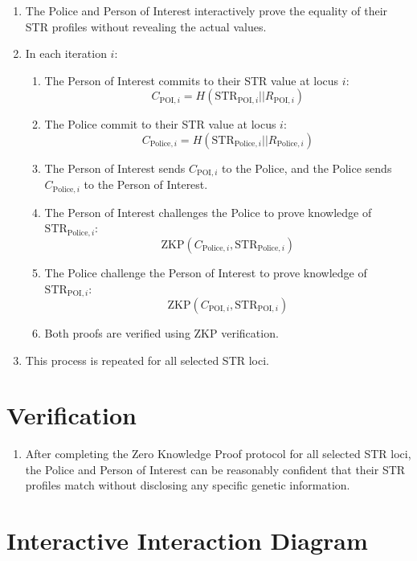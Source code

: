 \documentclass{article}
\begin{document}
\begin{enumerate}
    \item The Police and Person of Interest interactively prove the equality of their STR profiles without revealing the actual values.
    \item In each iteration $i$:
        \begin{enumerate}
            \item The Person of Interest commits to their STR value at locus $i$:
                \[ C_{\text{POI},i} = H(\text{STR}_{\text{POI},i} || R_{\text{POI},i}) \]
            \item The Police commit to their STR value at locus $i$:
                \[ C_{\text{Police},i} = H(\text{STR}_{\text{Police},i} || R_{\text{Police},i}) \]
            \item The Person of Interest sends $C_{\text{POI},i}$ to the Police, and the Police sends $C_{\text{Police},i}$ to the Person of Interest.
            \item The Person of Interest challenges the Police to prove knowledge of $\text{STR}_{\text{Police},i}$:
                \[ \text{ZKP}(C_{\text{Police},i}, \text{STR}_{\text{Police},i}) \]
            \item The Police challenge the Person of Interest to prove knowledge of $\text{STR}_{\text{POI},i}$:
                \[ \text{ZKP}(C_{\text{POI},i}, \text{STR}_{\text{POI},i}) \]
            \item Both proofs are verified using ZKP verification.
        \end{enumerate}
    \item This process is repeated for all selected STR loci.
\end{enumerate}

\section{Verification}

\begin{enumerate}
    \item After completing the Zero Knowledge Proof protocol for all selected STR loci, the Police and Person of Interest can be reasonably confident that their STR profiles match without disclosing any specific genetic information.
\end{enumerate}

\section{Interactive Interaction Diagram}
\end{document}
